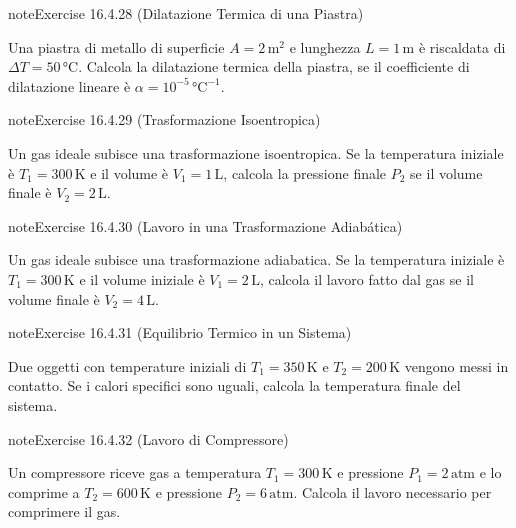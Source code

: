 \documentclass[letterpaper,10pt,italian]{jupyterBook}
\begin{document}
\begin{sphinxadmonition}{note}{Exercise 16.4.28 (Dilatazione Termica di una Piastra)}



\sphinxAtStartPar
Una piastra di metallo di superficie \(A = 2 \, \text{m}^2\) e lunghezza \(L = 1 \, \text{m}\) è riscaldata di \(\Delta T = 50 \, \text{°C}\). Calcola la dilatazione termica della piastra, se il coefficiente di dilatazione lineare è \( \alpha = 10^{-5} \, \text{°C}^{-1}\).
\end{sphinxadmonition}
 \label{exercise:ch/thermodynamics/matter-problems-exercise-28}

\begin{sphinxadmonition}{note}{Exercise 16.4.29 (Trasformazione Isoentropica)}



\sphinxAtStartPar
Un gas ideale subisce una trasformazione isoentropica. Se la temperatura iniziale è \(T_1 = 300 \, \text{K}\) e il volume è \(V_1 = 1 \, \text{L}\), calcola la pressione finale \(P_2\) se il volume finale è \(V_2 = 2 \, \text{L}\).
\end{sphinxadmonition}
 \label{exercise:ch/thermodynamics/matter-problems-exercise-29}

\begin{sphinxadmonition}{note}{Exercise 16.4.30 (Lavoro in una Trasformazione Adiabática)}



\sphinxAtStartPar
Un gas ideale subisce una trasformazione adiabatica. Se la temperatura iniziale è \(T_1 = 300 \, \text{K}\) e il volume iniziale è \(V_1 = 2 \, \text{L}\), calcola il lavoro fatto dal gas se il volume finale è \(V_2 = 4 \, \text{L}\).
\end{sphinxadmonition}
 \label{exercise:ch/thermodynamics/matter-problems-exercise-30}

\begin{sphinxadmonition}{note}{Exercise 16.4.31 (Equilibrio Termico in un Sistema)}



\sphinxAtStartPar
Due oggetti con temperature iniziali di \(T_1 = 350 \, \text{K}\) e \(T_2 = 200 \, \text{K}\) vengono messi in contatto. Se i calori specifici sono uguali, calcola la temperatura finale del sistema.
\end{sphinxadmonition}
 \label{exercise:ch/thermodynamics/matter-problems-exercise-31}

\begin{sphinxadmonition}{note}{Exercise 16.4.32 (Lavoro di Compressore)}



\sphinxAtStartPar
Un compressore riceve gas a temperatura \(T_1 = 300 \, \text{K}\) e pressione \(P_1 = 2 \, \text{atm}\) e lo comprime a \(T_2 = 600 \, \text{K}\) e pressione \(P_2 = 6 \, \text{atm}\). Calcola il lavoro necessario per comprimere il gas.
\end{sphinxadmonition}
\end{document}
